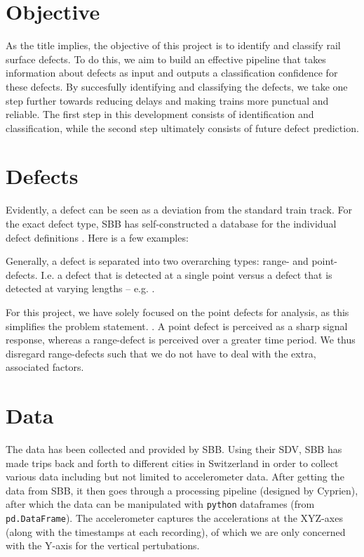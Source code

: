 \section{Objective}
As the title implies, the objective of this project is to identify and classify rail surface defects. To do this, we aim to build an effective pipeline that takes information about defects as input and outputs a classification confidence for these defects. By succesfully identifying and classifying the defects, we take one step further towards reducing delays and making trains more punctual and reliable. The first step in this development consists of identification and classification, while the second step ultimately consists of future defect prediction.

\section{Defects}
Evidently, a defect can be seen as a deviation from the standard train track. For the exact defect type, SBB has self-constructed a database for the individual defect definitions . Here is a few examples: 


Generally, a defect is separated into two overarching types: range- and point-defects. I.e. a defect that is detected at a single point versus a defect that is detected at varying lengths -- e.g. .

For this project, we have solely focused on the point defects for analysis, as this simplifies the problem statement. . A point defect is perceived as a sharp signal response, whereas a range-defect is perceived over a greater time period. We thus disregard range-defects such that we do not have to deal with the extra, associated factors. 



\section{Data}
The data has been collected and provided by SBB. Using their SDV, SBB has made trips back and forth to different cities in Switzerland in order to collect various data including but not limited to accelerometer data. After getting the data from SBB, it then goes through a processing pipeline (designed by Cyprien), after which the data can be manipulated with \verb|python| dataframes (from \verb|pd.DataFrame|). The accelerometer captures the accelerations at the XYZ-axes (along with the timestamps at each recording), of which we are only concerned with the Y-axis for the vertical pertubations.

